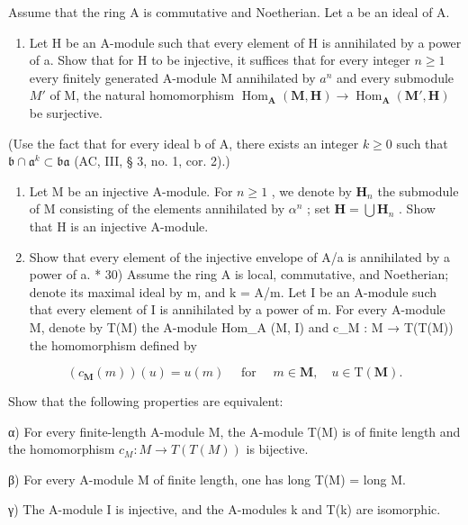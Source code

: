 Assume that the ring A is commutative and Noetherian. Let a be an ideal of A.

\begin{enumerate}
\def\labelenumi{\alph{enumi})}
\tightlist
\item
  Let H be an A-module such that every element of H is annihilated by a power of a. Show that for H to be injective, it suffices that for every integer \(n \geqslant 1\) every finitely generated A-module M annihilated by \(a^{n}\) and every submodule \(M'\) of M, the natural homomorphism \(\operatorname{Hom}_{\mathbf{A}}(\mathbf{M}, \mathbf{H}) \to \operatorname{Hom}_{\mathbf{A}}(\mathbf{M}', \mathbf{H})\) be surjective.
\end{enumerate}

(Use the fact that for every ideal b of A, there exists an integer \(k \geqslant 0\) such that \(\mathfrak{b} \cap \mathfrak{a}^k \subset \mathfrak{ba}\) (AC, III, § 3, no. 1, cor. 2).)

\begin{enumerate}
\def\labelenumi{\alph{enumi})}
\setcounter{enumi}{1}
\item
  Let M be an injective A-module. For \(n \geqslant 1\) , we denote by \(\mathbf{H}_{n}\) the submodule of M consisting of the elements annihilated by \(\alpha^{n}\) ; set \(\mathbf{H} = \bigcup \mathbf{H}_{n}\) . Show that H is an injective A-module.
\item
  Show that every element of the injective envelope of A/a is annihilated by a power of a. * 30) Assume the ring A is local, commutative, and Noetherian; denote its maximal ideal by m, and k = A/m. Let I be an A-module such that every element of I is annihilated by a power of m. For every A-module M, denote by T(M) the A-module Hom\_A (M, I) and c\_M : M → T(T(M)) the homomorphism defined by
\end{enumerate}

\[
\left(c _ {\mathbf {M}} (m)\right) (u) = u (m) \quad \text { for } \quad m \in \mathbf {M}  , \quad u \in \mathrm{T} (\mathbf {M})  .
\]

Show that the following properties are equivalent:

α) For every finite-length A-module M, the A-module T(M) is of finite length and the homomorphism \(c_{M}: M \to T(T(M))\) is bijective.

β) For every A-module M of finite length, one has long T(M) = long M.

γ) The A-module I is injective, and the A-modules k and T(k) are isomorphic.

